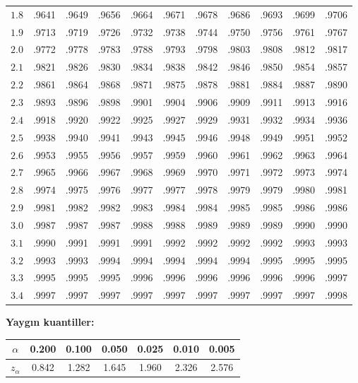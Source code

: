 \begin{center}
\begin{tabular}{r|cccccccccc}
$1.8$ & .9641 & .9649 & .9656 & .9664 & .9671 & .9678 & .9686 & .9693 & .9699 & .9706 \\
$1.9$ & .9713 & .9719 & .9726 & .9732 & .9738 & .9744 & .9750 & .9756 & .9761 & .9767 \\
\hline
$2.0$ & .9772 & .9778 & .9783 & .9788 & .9793 & .9798 & .9803 & .9808 & .9812 & .9817 \\
$2.1$ & .9821 & .9826 & .9830 & .9834 & .9838 & .9842 & .9846 & .9850 & .9854 & .9857 \\
$2.2$ & .9861 & .9864 & .9868 & .9871 & .9875 & .9878 & .9881 & .9884 & .9887 & .9890 \\
$2.3$ & .9893 & .9896 & .9898 & .9901 & .9904 & .9906 & .9909 & .9911 & .9913 & .9916 \\
$2.4$ & .9918 & .9920 & .9922 & .9925 & .9927 & .9929 & .9931 & .9932 & .9934 & .9936 \\
$2.5$ & .9938 & .9940 & .9941 & .9943 & .9945 & .9946 & .9948 & .9949 & .9951 & .9952 \\
$2.6$ & .9953 & .9955 & .9956 & .9957 & .9959 & .9960 & .9961 & .9962 & .9963 & .9964 \\
$2.7$ & .9965 & .9966 & .9967 & .9968 & .9969 & .9970 & .9971 & .9972 & .9973 & .9974 \\
$2.8$ & .9974 & .9975 & .9976 & .9977 & .9977 & .9978 & .9979 & .9979 & .9980 & .9981 \\
$2.9$ & .9981 & .9982 & .9982 & .9983 & .9984 & .9984 & .9985 & .9985 & .9986 & .9986 \\
\hline
$3.0$ & .9987 & .9987 & .9987 & .9988 & .9988 & .9989 & .9989 & .9989 & .9990 & .9990 \\
$3.1$ & .9990 & .9991 & .9991 & .9991 & .9992 & .9992 & .9992 & .9992 & .9993 & .9993 \\
$3.2$ & .9993 & .9993 & .9994 & .9994 & .9994 & .9994 & .9994 & .9995 & .9995 & .9995 \\
$3.3$ & .9995 & .9995 & .9995 & .9996 & .9996 & .9996 & .9996 & .9996 & .9996 & .9997 \\
$3.4$ & .9997 & .9997 & .9997 & .9997 & .9997 & .9997 & .9997 & .9997 & .9997 & .9998 \\
\hline
\end{tabular}
\end{center}

\bigskip
\noindent\textbf{Yaygın kuantiller:}

\begin{center}
\begin{tabular}{ccccccc}
\hline
$\alpha$ & 0.200 & 0.100 & 0.050 & 0.025 & 0.010 & 0.005 \\
\hline
$z_\alpha$ & 0.842 & 1.282 & 1.645 & 1.960 & 2.326 & 2.576 \\
\hline
\end{tabular}
\end{center}


